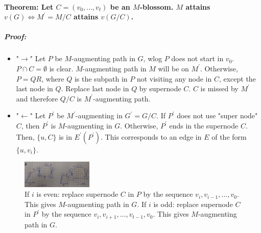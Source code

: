 \documentclass[main]{subfiles}
\begin{document}
\paragraph{Theorem: Let $C = (v_0, \dots, v_t)$ be an $M$-blossom. $M$ attains
$v(G) \iff M^\prime = M/C$ attains $v(G/C)$.}

\subparagraph{Proof:}
\begin{itemize}
\itemsep0em
\item "$\rightarrow$"
\subitem Let $P$ be $M$-augmenting path in $G$, wlog $P$ does not start in
$v_0$. $P \cap C = \emptyset$ is clear. $M$-augmenting path in $M$ will be on
$M^\prime$. Otherwise, $P = QR$, where $Q$ is the subpath in $P$ not visiting
any node in $C$, except the last node in $Q$. Replace last node in $Q$ by
supernode $C$. $C$ is missed by $M^\prime$ and therefore $Q/C$ is
$M^\prime$-augmenting path.
\item "$\leftarrow$"
\subitem Let $P^\prime$ be $M^\prime$-augmenting in $G^\prime = G/C$. If
$P^\prime$ does not use "super node" $C$, then $P^\prime$ is $M$-augmenting in
$G$. Otherwise, $P^\prime$ ends in the supernode $C$. Then, $\{u,C\}$ is in
$E^\prime(P^\prime)$. This corresponds to an edge in $E$ of the form
$\{u,v_i\}$.
\end{itemize}

\begin{figure}[!h]
  \centering
    \includegraphics[width=0.3\textwidth]{imgs/supernode.jpg}
	\caption{If $i$ is even: replace supernode $C$ in $P$ by the sequence $v_i,
	v_{i-1}, \dots, v_0$. This gives $M$-augmenting path in $G$. If $i$ is odd:
	replace supernode $C$ in $P^\prime$ by the sequence $v_i, v_{i+1}, \dots,
	v_{t-1}, v_0$. This gives $M$-augmenting path in $G$.}
\end{figure}
\end{document}
